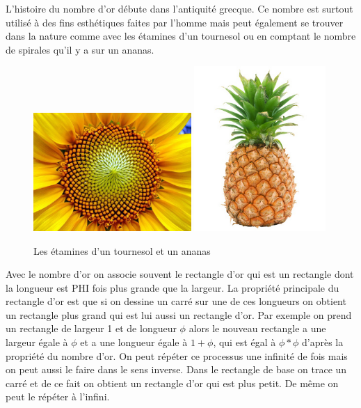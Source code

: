 \documentclass[french,11pt]{report}
\begin{document}
L’histoire du nombre d’or débute dans l’antiquité grecque. Ce nombre est surtout utilisé à des fins esthétiques faites par l’homme mais peut également se trouver dans la nature comme avec les étamines d’un tournesol ou en comptant le nombre de spirales qu’il y a sur un ananas.\\

\vspace*{35mm}

\begin{figure} [!h]
    \centering
    \includegraphics[width=6cm]{tournesol}
    \label{fig:tournesol}
    \includegraphics[width=5cm]{ananas}
    \label{fig:ananas}
    \caption{Les étamines d'un tournesol et un ananas}
\end{figure}

Avec le nombre d’or on associe souvent le rectangle d’or qui est un rectangle dont la longueur est PHI fois plus grande que la largeur. La propriété principale du rectangle d’or est que si on dessine un carré sur une de ces longueurs on obtient un rectangle plus grand qui est lui aussi un rectangle d’or. Par exemple on prend un rectangle de largeur 1 et de longueur \begin{math}\phi\end{math} alors le nouveau rectangle a une largeur égale à \begin{math}\phi\end{math} et a une longueur égale à \begin{math}1 + \phi\end{math}, qui est égal à \begin{math}\phi * \phi\end{math} d’après la propriété du nombre d’or. On peut répéter ce processus une infinité de fois mais on peut aussi le faire dans le sens inverse. Dans le rectangle de base on trace un carré et de ce fait on obtient un rectangle d’or qui est plus petit. De même on peut le répéter à l’infini.\\
\end{document}
